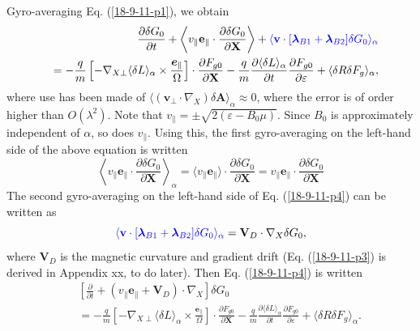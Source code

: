 \documentclass{article}
\newcommand{\tmcolor}[2]{{\color{#1}{#2}}}
\newcommand{\tmmathbf}[1]{\ensuremath{\boldsymbol{#1}}}
\begin{document}
Gyro-averaging Eq. (\ref{18-9-11-p1}), we obtain
\begin{eqnarray}
  &  & \frac{\partial \delta G_0}{\partial t} + \left\langle v_{\parallel}
  \mathbf{e}_{\parallel} \cdot \frac{\partial \delta G_0}{\partial \mathbf{X}}
  \right\rangle + \tmcolor{blue}{\langle \mathbf{v} \cdot
  [\tmmathbf{\lambda}_{B 1} +\tmmathbf{\lambda}_{B 2}] \delta G_0
  \rangle_{\alpha}} \nonumber\\
  &  & = - \frac{q}{m} \left[ - \nabla_{X \perp} \langle \delta L
  \rangle_{\alpha} \times \frac{\tmmathbf{e}_{\parallel}}{\Omega} \right]
  \cdot \frac{\partial F_{g 0}}{\partial \mathbf{X}} - \frac{q}{m} 
  \frac{\partial \langle \delta L \rangle_{\alpha}}{\partial t} 
  \frac{\partial F_{g 0}}{\partial \varepsilon} + \langle \delta R \delta F_g
  \rangle_{\alpha},  \label{18-9-11-p4}
\end{eqnarray}
where use has been made of $\langle (\mathbf{v}_{\perp} \cdot \nabla_X) \delta
\mathbf{A} \rangle_{\alpha} \approx 0$, where the error is of order higher
than $O (\lambda^2)$. Note that $v_{\parallel} = \pm \sqrt{2 (\varepsilon -
B_0 \mu)}$. Since $B_0$ is approximately independent of $\alpha$, so does
$v_{\parallel}$. Using this, the first gyro-averaging on the left-hand side of
the above equation is written
\begin{equation}
  \left\langle v_{\parallel} \mathbf{e}_{\parallel} \cdot \frac{\partial
  \delta G_0}{\partial \mathbf{X}} \right\rangle_{\alpha} = \langle
  v_{\parallel} \mathbf{e}_{\parallel} \rangle \cdot \frac{\partial \delta
  G_0}{\partial \mathbf{X}} = v_{\parallel} \mathbf{e}_{\parallel} \cdot
  \frac{\partial \delta G_0}{\partial \mathbf{X}}
\end{equation}
The second gyro-averaging on the left-hand side of Eq. (\ref{18-9-11-p4}) can
be written as
\begin{equation}
  \label{18-9-11-p3} \tmcolor{blue}{\langle \mathbf{v} \cdot
  [\tmmathbf{\lambda}_{B 1} +\tmmathbf{\lambda}_{B 2}] \delta G_0
  \rangle_{\alpha}} =\mathbf{V}_D \cdot \nabla_X \delta G_0,
\end{equation}
where $\mathbf{V}_D$ is the magnetic curvature and gradient drift (Eq.
(\ref{18-9-11-p3}) is derived in Appendix xx, to do later). Then Eq.
(\ref{18-9-11-p4}) is written
\begin{eqnarray}
  &  & \left[ \frac{\partial}{\partial t} + (v_{\parallel}
  \mathbf{e}_{\parallel} +\mathbf{V}_D) \cdot \nabla_X \right] \delta G_0
  \nonumber\\
  &  & = - \frac{q}{m} \left[ - \nabla_{X \perp} \langle \delta L
  \rangle_{\alpha} \times \frac{\tmmathbf{e}_{\parallel}}{\Omega} \right]
  \cdot \frac{\partial F_{g 0}}{\partial \mathbf{X}} - \frac{q}{m} 
  \frac{\partial \langle \delta L \rangle_{\alpha}}{\partial t} 
  \frac{\partial F_{g 0}}{\partial \varepsilon} + \langle \delta R \delta F_g
  \rangle_{\alpha} .  \label{17-5-5-1}
\end{eqnarray}
\end{document}
